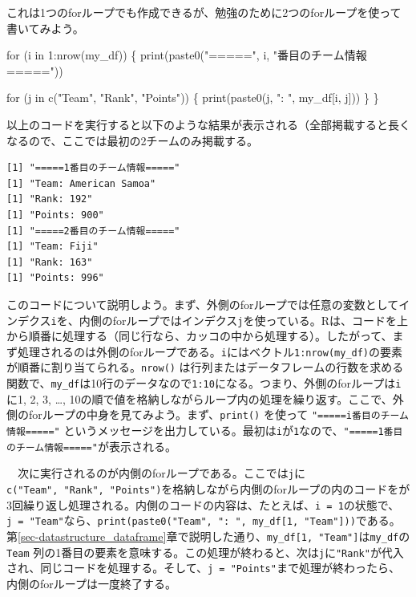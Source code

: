 \documentclass[
  a4paper,
  pandoc,
  ja=standard,
  jafont=haranoaji]{bxjsbook}
\newenvironment{Shaded}{\begin{snugshade}}{\end{snugshade}}
\newcommand{\ControlFlowTok}[1]{\textcolor[rgb]{0.00,0.48,0.65}{#1}}
\newcommand{\DecValTok}[1]{\textcolor[rgb]{0.68,0.00,0.00}{#1}}
\newcommand{\FunctionTok}[1]{\textcolor[rgb]{0.28,0.35,0.67}{#1}}
\newcommand{\NormalTok}[1]{\textcolor[rgb]{0.00,0.48,0.65}{#1}}
\newcommand{\SpecialCharTok}[1]{\textcolor[rgb]{0.37,0.37,0.37}{#1}}
\newcommand{\StringTok}[1]{\textcolor[rgb]{0.13,0.47,0.30}{#1}}
\begin{document}
これは1つのforループでも作成できるが、勉強のために2つのforループを使って書いてみよう。

\begin{Shaded}
\begin{Highlighting}[numbers=left,,]
\ControlFlowTok{for}\NormalTok{ (i }\ControlFlowTok{in} \DecValTok{1}\SpecialCharTok{:}\FunctionTok{nrow}\NormalTok{(my\_df)) \{}
  \FunctionTok{print}\NormalTok{(}\FunctionTok{paste0}\NormalTok{(}\StringTok{"====="}\NormalTok{, i, }\StringTok{"番目のチーム情報====="}\NormalTok{))}
  
  \ControlFlowTok{for}\NormalTok{ (j }\ControlFlowTok{in} \FunctionTok{c}\NormalTok{(}\StringTok{"Team"}\NormalTok{, }\StringTok{"Rank"}\NormalTok{, }\StringTok{"Points"}\NormalTok{)) \{}
    \FunctionTok{print}\NormalTok{(}\FunctionTok{paste0}\NormalTok{(j, }\StringTok{": "}\NormalTok{, my\_df[i, j]))}
\NormalTok{  \}}
\NormalTok{\}}
\end{Highlighting}
\end{Shaded}

以上のコードを実行すると以下のような結果が表示される（全部掲載すると長くなるので、ここでは最初の2チームのみ掲載する。

\begin{verbatim}
[1] "=====1番目のチーム情報====="
[1] "Team: American Samoa"
[1] "Rank: 192"
[1] "Points: 900"
[1] "=====2番目のチーム情報====="
[1] "Team: Fiji"
[1] "Rank: 163"
[1] "Points: 996"
\end{verbatim}

このコードについて説明しよう。まず、外側のforループでは任意の変数としてインデクス\texttt{i}を、内側のforループではインデクス\texttt{j}を使っている。Rは、コードを上から順番に処理する（同じ行なら、カッコの中から処理する）。したがって、まず処理されるのは外側のforループである。\texttt{i}にはベクトル\texttt{1:nrow(my\_df)}の要素が順番に割り当てられる。\texttt{nrow()}
は行列またはデータフレームの行数を求める関数で、\texttt{my\_df}は10行のデータなので\texttt{1:10}になる。つまり、外側のforループは\texttt{i}に1,
2, 3, \ldots,
10の順で値を格納しながらループ内の処理を繰り返す。ここで、外側のforループの中身を見てみよう。まず、\texttt{print()}
を使って \texttt{"=====i番目のチーム情報====="}
というメッセージを出力している。最初は\texttt{i}が\texttt{1}なので、\texttt{"=====1番目のチーム情報====="}が表示される。

　次に実行されるのが内側のforループである。ここでは\texttt{j}に\texttt{c("Team",\ "Rank",\ "Points")}を格納しながら内側のforループの内のコードをが3回繰り返し処理される。内側のコードの内容は、たとえば、\texttt{i\ =\ 1}の状態で、\texttt{j\ =\ "Team"}なら、\texttt{print(paste0("Team",\ ":\ ",\ my\_df{[}1,\ "Team"{]}))}である。第\ref{sec-datastructure_dataframe}章で説明した通り、\texttt{my\_df{[}1,\ "Team"{]}}は\texttt{my\_df}の\texttt{Team}
列の1番目の要素を意味する。この処理が終わると、次は\texttt{j}に\texttt{"Rank"}が代入され、同じコードを処理する。そして、\texttt{j\ =\ "Points"}まで処理が終わったら、内側のforループは一度終了する。
\end{document}
